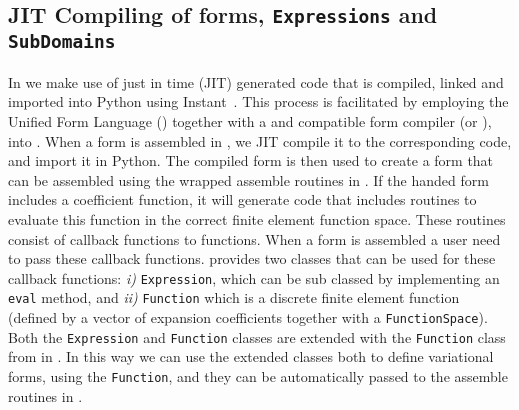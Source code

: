 \begin{code}
\section{JIT Compiling of \ufl forms, \texttt{Expressions} and \texttt{SubDomains}}
In \pydolfin we make use of just in time (JIT) generated \ufc code that is compiled, linked and imported into Python using Instant~\cite{Instant}. This process is facilitated by employing the Unified Form Language (\ufl) together with a \ufl and \ufc compatible form compiler (\ffc or \sfc), into \pydolfin. When a \ufl form is assembled in \pydolfin, we JIT compile it to the corresponding \ufc code, and import it in Python. The compiled \ufc form is then used to create a \dolfin form that can be assembled using the \swig wrapped assemble routines in \dolfin. If the handed \ufl form includes a coefficient function, it will generate \ufc code that includes routines to evaluate this function in the correct finite element function space. These routines consist of callback functions to \ufc functions. When a \ufc form is assembled a user need to pass these callback functions. \dolfin provides two classes that can be used for these callback functions: \textit{i)} \texttt{Expression}, which can be sub classed by implementing an \texttt{eval} method, and \textit{ii)} \texttt{Function} which is a discrete finite element function (defined by a vector of expansion coefficients together with a \texttt{FunctionSpace}). Both the \texttt{Expression} and \texttt{Function} classes are extended with the \texttt{Function} class from \ufl in \pydolfin. In this way we can use the extended classes both to define variational forms, using the \ufl \texttt{Function}, and they can be automatically passed to the assemble routines in \dolfin. \par


\end{code}

